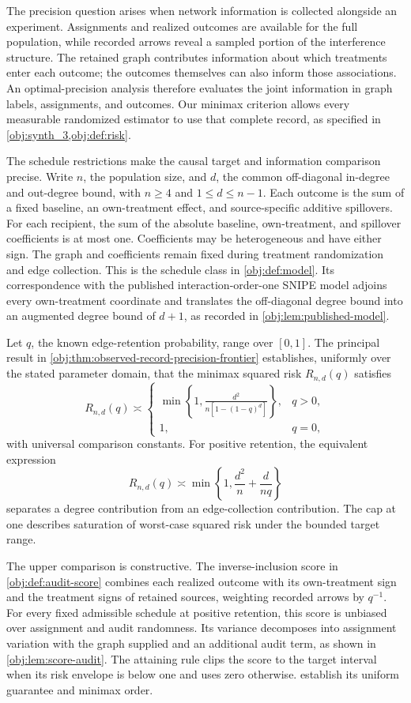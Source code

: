 \documentclass[11pt]{article}
\begin{document}
The precision question arises when network information is collected alongside an experiment. Assignments and realized outcomes are available for the full population, while recorded arrows reveal a sampled portion of the interference structure. The retained graph contributes information about which treatments enter each outcome; the outcomes themselves can also inform those associations. An optimal-precision analysis therefore evaluates the joint information in graph labels, assignments, and outcomes. Our minimax criterion allows every measurable randomized estimator to use that complete record, as specified in \cref{obj:synth_3,obj:def:risk}.

The schedule restrictions make the causal target and information comparison precise. Write \(n\), the population size, and \(d\), the common off-diagonal in-degree and out-degree bound, with \(n\ge4\) and \(1\le d\le n-1\). Each outcome is the sum of a fixed baseline, an own-treatment effect, and source-specific additive spillovers. For each recipient, the sum of the absolute baseline, own-treatment, and spillover coefficients is at most one. Coefficients may be heterogeneous and have either sign. The graph and coefficients remain fixed during treatment randomization and edge collection. This is the schedule class in \cref{obj:def:model}. Its correspondence with the published interaction-order-one SNIPE model adjoins every own-treatment coordinate and translates the off-diagonal degree bound into an augmented degree bound of \(d+1\), as recorded in \cref{obj:lem:published-model}.

Let \(q\), the known edge-retention probability, range over \([0,1]\). The principal result in \cref{obj:thm:observed-record-precision-frontier} establishes, uniformly over the stated parameter domain, that the minimax squared risk \(R_{n,d}(q)\) satisfies
\[
R_{n,d}(q)\asymp
\begin{cases}
\displaystyle
\min\left\{1,\frac{d^2}{n[1-(1-q)^d]}\right\},&q>0,\\[6pt]
1,&q=0,
\end{cases}
\]
with universal comparison constants. For positive retention, the equivalent expression
\[
R_{n,d}(q)\asymp
\min\left\{1,\frac{d^2}{n}+\frac{d}{nq}\right\}
\]
separates a degree contribution from an edge-collection contribution. The cap at one describes saturation of worst-case squared risk under the bounded target range.

The upper comparison is constructive. The inverse-inclusion score in \cref{obj:def:audit-score} combines each realized outcome with its own-treatment sign and the treatment signs of retained sources, weighting recorded arrows by \(q^{-1}\). For every fixed admissible schedule at positive retention, this score is unbiased over assignment and audit randomness. Its variance decomposes into assignment variation with the graph supplied and an additional audit term, as shown in \cref{obj:lem:score-audit}. The attaining rule clips the score to the target interval when its risk envelope is below one and uses zero otherwise.  establish its uniform guarantee and minimax order.
\end{document}
